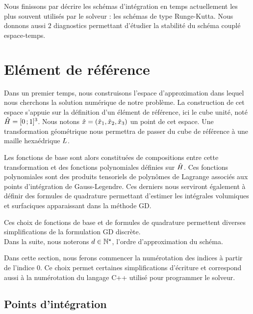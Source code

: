 Nous finissons par décrire les schémas d'intégration en temps
actuellement les plus souvent utilisés par le solveur :
les schémas de type Runge-Kutta.
Nous donnons aussi $2$ diagnostics permettant d'étudier
la stabilité du schéma couplé espace-temps.
\\



\section{Elément de référence}
\label{sect:maille_de_reference}


Dans un premier temps, nous construisons l’espace d’approximation dans
lequel nous cherchons la solution numérique de notre problème. La construction
de cet espace s’appuie sur la définition d’un élément de référence, ici
le cube unité, noté $\hat{H} = \lbrack0\,;1\rbrack^{3}$.
Nous notons $\hat{x} = \left({\hat{x}}_1,{\hat{x}}_2,{\hat{x}}_3\right)$ un point de cet espace.
Une transformation géométrique
nous permettra de passer du cube de référence à une maille hexaédrique $L$.

Les fonctions de base sont alors constituées de compositions entre cette
transformation et des fonctions polynomiales définies sur $\hat{H}$.
Ces fonctions polynomiales sont des produits tensoriels de polynômes de Lagrange
associés aux points d'intégration de Gauss-Legendre. Ces derniers nous serviront
également à définir des formules de quadrature permettant d’estimer les intégrales
volumiques et surfaciques apparaissant dans la méthode GD.

Ces choix de fonctions
de base et de formules de quadrature permettent diverses simplifications de
la formulation GD discrète.
\\


Dans la suite, nous noterons $d \in \mathbb{N}^\star$, l’ordre d’approximation du schéma.

\begin{remark}
	Dans cette section, nous ferons commencer la numérotation des indices
	à partir de l’indice 0. Ce choix permet certaines simplifications
	d’écriture et correspond aussi à la numérotation du langage C++ utilisé
	pour programmer le solveur.
	\\
\end{remark}


\subsection{Points d'intégration}
\label{ssect:points_integration}


